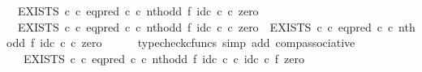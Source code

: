 \begin{isabellebody}
\ \ {\isachardoublequoteopen}{\isacharparenleft}{\kern0pt}EXISTS\ {\isasymnat}\isactrlsub c\ {\isasymcirc}\isactrlsub c\ {\isacharparenleft}{\kern0pt}eq{\isacharunderscore}{\kern0pt}pred\ {\isasymnat}\isactrlsub c\ {\isasymcirc}\isactrlsub c\ nth{\isacharunderscore}{\kern0pt}odd\ {\isasymtimes}\isactrlsub f\ id\isactrlsub c\ {\isasymnat}\isactrlsub c{\isacharparenright}{\kern0pt}\isactrlsup {\isasymsharp}{\isacharparenright}{\kern0pt}\ {\isasymcirc}\isactrlsub c\ zero\ {\isacharequal}{\kern0pt}\ {\isasymf}{\isachardoublequoteclose}\isanewline
%
\isadelimproof
%
\endisadelimproof
%
\isatagproof
{}\isamarkupfalse%
\ {\isacharminus}{\kern0pt}\isanewline
\ \ \isamarkupfalse%
\ \ {\isachardoublequoteopen}{\isacharparenleft}{\kern0pt}EXISTS\ {\isasymnat}\isactrlsub c\ {\isasymcirc}\isactrlsub c\ {\isacharparenleft}{\kern0pt}eq{\isacharunderscore}{\kern0pt}pred\ {\isasymnat}\isactrlsub c\ {\isasymcirc}\isactrlsub c\ nth{\isacharunderscore}{\kern0pt}odd\ {\isasymtimes}\isactrlsub f\ id\isactrlsub c\ {\isasymnat}\isactrlsub c{\isacharparenright}{\kern0pt}\isactrlsup {\isasymsharp}{\isacharparenright}{\kern0pt}\ {\isasymcirc}\isactrlsub c\ zero\ {\isacharequal}{\kern0pt}\ EXISTS\ {\isasymnat}\isactrlsub c\ {\isasymcirc}\isactrlsub c\ {\isacharparenleft}{\kern0pt}eq{\isacharunderscore}{\kern0pt}pred\ {\isasymnat}\isactrlsub c\ {\isasymcirc}\isactrlsub c\ nth{\isacharunderscore}{\kern0pt}odd\ {\isasymtimes}\isactrlsub f\ id\isactrlsub c\ {\isasymnat}\isactrlsub c{\isacharparenright}{\kern0pt}\isactrlsup {\isasymsharp}\ {\isasymcirc}\isactrlsub c\ zero{\isachardoublequoteclose}\isanewline
\ \ \ \ \isamarkupfalse%
\ {\isacharparenleft}{\kern0pt}typecheck{\isacharunderscore}{\kern0pt}cfuncs{\isacharcomma}{\kern0pt}\ simp\ add{\isacharcolon}{\kern0pt}\ comp{\isacharunderscore}{\kern0pt}associative{}{\isacharparenright}{\kern0pt}\isanewline
\ \ \isamarkupfalse%
\ \isamarkupfalse%
\ {\isachardoublequoteopen}{\isachardot}{\kern0pt}{\isachardot}{\kern0pt}{\isachardot}{\kern0pt}\ {\isacharequal}{\kern0pt}\ EXISTS\ {\isasymnat}\isactrlsub c\ {\isasymcirc}\isactrlsub c\ {\isacharparenleft}{\kern0pt}eq{\isacharunderscore}{\kern0pt}pred\ {\isasymnat}\isactrlsub c\ {\isasymcirc}\isactrlsub c\ {\isacharparenleft}{\kern0pt}nth{\isacharunderscore}{\kern0pt}odd\ {\isasymtimes}\isactrlsub f\ id\isactrlsub c\ {\isasymnat}\isactrlsub c{\isacharparenright}{\kern0pt}\ {\isasymcirc}\isactrlsub c\ {\isacharparenleft}{\kern0pt}id\isactrlsub c\ {\isasymnat}\isactrlsub c\ {\isasymtimes}\isactrlsub f\ zero{\isacharparenright}{\kern0pt}{\isacharparenright}{\kern0pt}\isactrlsup {\isasymsharp}{\isachardoublequoteclose}\isanewline

\end{isabellebody}
